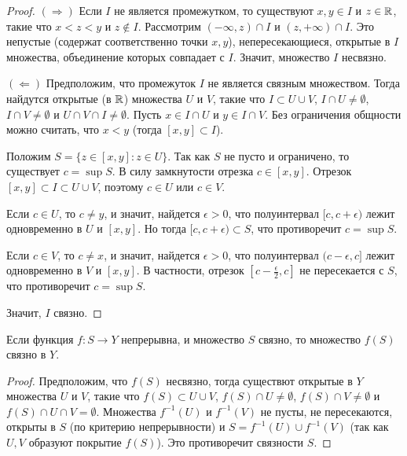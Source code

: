 \begin{proof}
    $(\Rightarrow)$ Если $I$ не является промежутком, то существуют $x, y \in I$ и $z \in \mathbb{R}$, такие что $x < z < y$ и $z \not\in I$. Рассмотрим $(-\infty, z) \cap I$ и $(z, +\infty) \cap I$. Это непустые (содержат соответственно точки $x, y$), непересекающиеся, открытые в $I$ множества, объединение которых совпадает с $I$. Значит, множество $I$ несвязно.
    
    $(\Leftarrow)$ Предположим, что промежуток $I$ не является связным множеством. Тогда найдутся открытые (в $\mathbb{R}$) множества $U$ и $V$, такие что $I \subset U \cup V$, $I \cap U \neq \emptyset$, $I \cap V \neq \emptyset$ и $U \cap V \cap I \neq \emptyset$. Пусть $x \in I \cap U$ и $y \in I \cap V$. Без ограничения общности можно считать, что $x < y$ (тогда $[x,y] \subset I$).

    Положим $S = \{z \in [x, y]: z \in U\}$. Так как $S$ не пусто и ограничено, то существует $c = \sup S$. В силу замкнутости отрезка $c \in [x, y]$. Отрезок $[x, y] \subset I \subset U \cup V$, поэтому $c \in U$ или $c \in V$.

    Если $c \in U$, то $c \neq y$, и значит, найдется $\epsilon > 0$, что полуинтервал $[c, c+\epsilon)$ лежит одновременно в $U$ и $[x, y]$. Но тогда $[c, c + \epsilon) \subset S$, что противоречит $c = \sup S$.

    Если $c \in V$, то $c \neq x$, и значит, найдется $\epsilon > 0$, что полуинтервал $(c - \epsilon, c]$ лежит одновременно в $V$ и $[x, y]$. В частности, отрезок $[c - \frac{\epsilon}{2}, c]$ не пересекается с $S$, что противоречит $c = \sup S$.

    Значит, $I$ связно.
\end{proof}

\begin{theorem}
    \label{th_contin_coher}
    Если функция $f: S \to Y$ непрерывна, и множество $S$ связно, то множество $f(S)$ связно в $Y$.
\end{theorem}

\begin{proof}
    Предположим, что $f(S)$ несвязно, тогда существют открытые в $Y$ множества $U$ и $V$, такие что $f(S) \subset U \cup V$, $f(S) \cap U \neq \emptyset$, $f(S) \cap V \neq \emptyset$ и $f(S) \cap U \cap V = \emptyset$. Множества $f^{-1}(U)$ и $f^{-1}(V)$ не пусты, не пересекаются, открыты в $S$ (по критерию непрерывности) и $S = f^{-1}(U) \cup f^{-1}(V)$ (так как $U, V$ образуют покрытие $f(S)$). Это противоречит связности $S$.
\end{proof}

